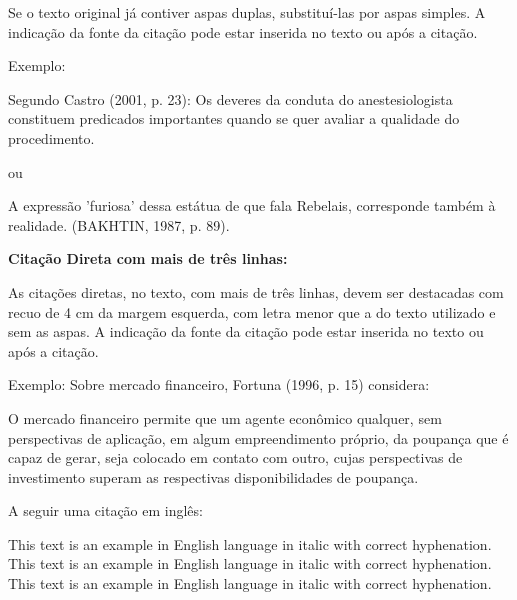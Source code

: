 Se o texto original já contiver aspas duplas, substituí-las por aspas simples. A indicação da fonte da citação pode
estar inserida no texto ou após a citação.\\

\bigskip

{\color{red}
Exemplo:}

\bigskip

Segundo Castro (2001, p. 23): {\textquotedbl}Os deveres da conduta do anestesiologista constituem predicados importantes
quando se quer avaliar a qualidade do procedimento.{\textquotedbl}\\

\bigskip

{\color{red}
ou}

\bigskip

{
{\textquotedbl}A expressão 'furiosa' dessa estátua de que fala Rebelais, corresponde também à realidade.{\textquotedbl}
(BAKHTIN, 1987, p. 89).}

\bigskip

{\centering\bfseries\color{red}
Citação Direta com mais de três linhas:
\par}

\bigskip

As citações diretas, no texto, com mais de três linhas, devem ser
destacadas com recuo de 4 cm da margem esquerda, com letra menor que a do texto utilizado e sem as aspas. A indicação da fonte da citação pode estar inserida no texto ou após a citação. \\ 

\bigskip

{\color{red}
Exemplo:}
\bigskip
Sobre mercado financeiro, Fortuna (1996, p. 15) considera:\\
\bigskip

\begin{citacao}
O mercado financeiro permite que um agente econômico qualquer, sem perspectivas de aplicação, em algum empreendimento
próprio, da poupança que é capaz de gerar, seja colocado em contato com outro, cujas perspectivas de investimento
superam as respectivas disponibilidades de poupança.\\
\end{citacao}

\bigskip
A seguir uma citação em inglês:\\

\begin{citacao}[english]
This text is an example in English language in italic with correct hyphenation. This text is an example in English language in italic with correct hyphenation. This text is an example in English language in italic with correct hyphenation.
\end{citacao}
\bigskip

